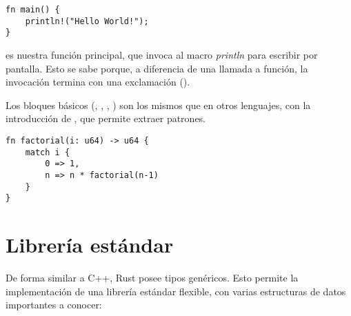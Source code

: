 \begin{verbatim}
fn main() {
    println!("Hello World!");
}
\end{verbatim}

 es nuestra función principal, que invoca al macro \emph{println}
para escribir por pantalla. Esto se sabe porque, a diferencia de una llamada a
función, la invocación termina con una exclamación (\code{!}).

Los bloques básicos (, , , ) son los
mismos que en otros lenguajes, con la introducción de , que permite
extraer patrones.

\begin{verbatim}
fn factorial(i: u64) -> u64 {
    match i {
        0 => 1,
        n => n * factorial(n-1)
    }
}
\end{verbatim}

\section{Librería estándar}

De forma similar a C++, Rust posee tipos genéricos. Esto permite la
implementación de una librería estándar flexible, con varias estructuras de
datos importantes a conocer:

